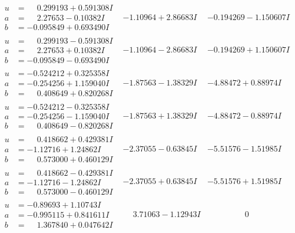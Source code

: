 \documentclass[1p]{elsarticle_modified}
\theoremstyle{definition}
\begin{document}
$$\begin{array}{c|c|c}
\begin{aligned}
u &= \phantom{-}0.299193 + 0.591308 I \\
a &= \phantom{-}2.27653 - 0.10382 I \\
b &= -0.095849 + 0.693490 I\end{aligned}
 & -1.10964 + 2.86683 I & -0.194269 - 1.150607 I \\ \hline\begin{aligned}
u &= \phantom{-}0.299193 - 0.591308 I \\
a &= \phantom{-}2.27653 + 0.10382 I \\
b &= -0.095849 - 0.693490 I\end{aligned}
 & -1.10964 - 2.86683 I & -0.194269 + 1.150607 I \\ \hline\begin{aligned}
u &= -0.524212 + 0.325358 I \\
a &= -0.254256 + 1.159040 I \\
b &= \phantom{-}0.408649 + 0.820268 I\end{aligned}
 & -1.87563 - 1.38329 I & -4.88472 + 0.88974 I \\ \hline\begin{aligned}
u &= -0.524212 - 0.325358 I \\
a &= -0.254256 - 1.159040 I \\
b &= \phantom{-}0.408649 - 0.820268 I\end{aligned}
 & -1.87563 + 1.38329 I & -4.88472 - 0.88974 I \\ \hline\begin{aligned}
u &= \phantom{-}0.418662 + 0.429381 I \\
a &= -1.12716 + 1.24862 I \\
b &= \phantom{-}0.573000 + 0.460129 I\end{aligned}
 & -2.37055 - 0.63845 I & -5.51576 - 1.51985 I \\ \hline\begin{aligned}
u &= \phantom{-}0.418662 - 0.429381 I \\
a &= -1.12716 - 1.24862 I \\
b &= \phantom{-}0.573000 - 0.460129 I\end{aligned}
 & -2.37055 + 0.63845 I & -5.51576 + 1.51985 I \\ \hline\begin{aligned}
u &= -0.89693 + 1.10743 I \\
a &= -0.995115 + 0.841611 I \\
b &= \phantom{-}1.367840 + 0.047642 I\end{aligned}
 & \phantom{-}3.71063 - 1.12943 I & \phantom{-0.000000 } 0 \\ \hline\begin{aligned}

\end{aligned}
\end{array}$$
\end{document}
